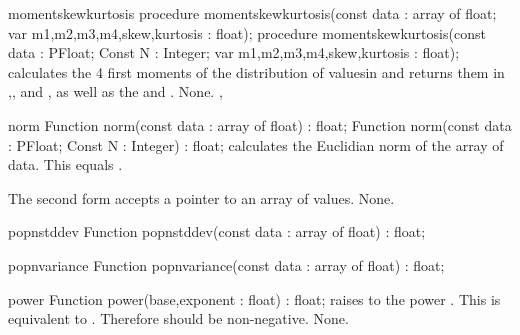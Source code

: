

\begin{procedure}{momentskewkurtosis}
\Declaration
procedure momentskewkurtosis(const data : array of float;
  var m1,m2,m3,m4,skew,kurtosis : float);
procedure momentskewkurtosis(const data : PFloat; Const N : Integer;
  var m1,m2,m3,m4,skew,kurtosis : float);
\Description
{} calculates the 4 first moments of the distribution
of valuesin  and returns them in ,, and
, as well as the  and .
\Errors
None.
\SeeAlso
{}, 
\end{procedure}


\begin{function}{norm}
\Declaration
Function norm(const data : array of float) : float;
Function norm(const data : PFloat; Const N : Integer) : float;
\Description
{} calculates the Euclidian norm of the array of data.
This equals .

The second form accepts a pointer to an array of  values.
\Errors
None.
\SeeAlso
{}
\end{function}



\begin{function}{popnstddev}
\Declaration
Function popnstddev(const data : array of float) : float;
\Description

\Errors
\SeeAlso
\end{function}

\FPCexample{}


\begin{function}{popnvariance}
\Declaration
Function popnvariance(const data : array of float) : float;
\Description

\Errors
\SeeAlso
\end{function}

\FPCexample{}


\begin{function}{power}
\Declaration
Function power(base,exponent : float) : float;
\Description
{} raises  to the power . This is equivalent
to . Therefore  should be non-negative.
\Errors
None.
\SeeAlso
{}
\end{function}

\FPCexample{}


